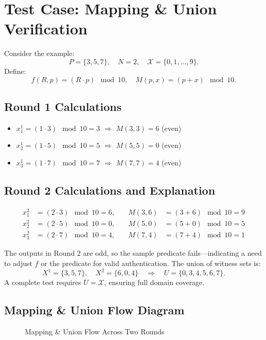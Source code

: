 \documentclass[10pt,twocolumn]{article}
\begin{document}
\section{Test Case: Mapping \& Union Verification}
Consider the example:
\[
P = \{3, 5, 7\}, \quad N = 2, \quad \mathcal{X} = \{0,1,\dots,9\}.
\]
Define:
\[
f(R,p) = (R \cdot p) \mod 10,\quad M(p,x) = (p + x) \mod 10.
\]

\subsection{Round 1 Calculations}
\begin{itemize}[leftmargin=0.5cm]
    \item \(x_1^1 = (1\cdot3) \mod 10 = 3\) \(\Rightarrow\) \(M(3,3) = 6\) (even)
    \item \(x_2^1 = (1\cdot5) \mod 10 = 5\) \(\Rightarrow\) \(M(5,5) = 0\) (even)
    \item \(x_3^1 = (1\cdot7) \mod 10 = 7\) \(\Rightarrow\) \(M(7,7) = 4\) (even)
\end{itemize}

\subsection{Round 2 Calculations and Explanation}
\begin{align*}
    x_1^2 &= (2 \cdot 3) \mod 10 = 6, \quad &M(3,6) &= (3+6) \mod 10 = 9  \\
    x_2^2 &= (2 \cdot 5) \mod 10 = 0, \quad &M(5,0) &= (5+0) \mod 10 = 5  \\
    x_3^2 &= (2 \cdot 7) \mod 10 = 4, \quad &M(7,4) &= (7+4) \mod 10 = 1
\end{align*}

The outputs in Round 2 are odd, so the sample predicate fails—indicating a need to adjust \(f\) or the predicate for valid authentication. The union of witness sets is:
\[
X^1 = \{3,5,7\},\quad X^2 = \{6,0,4\} \quad \Longrightarrow \quad U = \{0,3,4,5,6,7\}.
\]
A complete test requires \(U = \mathcal{X}\), ensuring full domain coverage.

\subsection{Mapping \& Union Flow Diagram}
\begin{figure}[!htbp]
\centering
{}
\caption{Mapping \& Union Flow Across Two Rounds}
\label{fig:mapping-union}
\end{figure}
\end{document}
